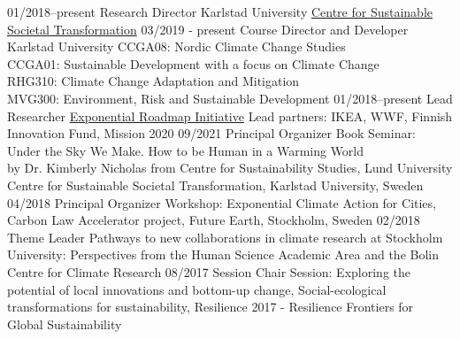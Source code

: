 \documentclass[]{friggeri-cv} %
\begin{document}
\begin{entrylist}
\entry
{\small{01/2018--present}}
{Research Director}
{Karlstad University}
{\href{https://www.kau.se/en/crs}{Centre for Sustainable Societal Transformation}}
\entry
{\small{03/2019 - present}}
{Course Director and Developer}
{Karlstad University}
{CCGA08: Nordic Climate Change Studies\\
CCGA01: Sustainable Development with a focus on Climate Change\\
RHG310: Climate Change Adaptation and Mitigation\\
MVG300: Environment, Risk and Sustainable Development}
\entry
{\small{01/2018--present}}
{Lead Researcher}
{\href{https://exponentialroadmap.org}{Exponential Roadmap Initiative}}
{Lead partners: IKEA, WWF, Finnish Innovation Fund, Mission 2020}
\entry
{\small{09/2021}}
{Principal Organizer}
{}
{Book Seminar: Under the Sky We Make. How to be Human in a Warming World\\
by Dr. Kimberly Nicholas from Centre for Sustainability Studies, Lund University\\
Centre for Sustainable Societal Transformation, Karlstad University, Sweden}
\entry
{\small{04/2018}}
{Principal Organizer}
{}
{Workshop: Exponential Climate Action for Cities, Carbon Law Accelerator project, Future Earth, Stockholm, Sweden}
\entry
{\small{02/2018}}
{Theme Leader}
{}
{Pathways to new collaborations in climate research at Stockholm University: Perspectives from the Human Science Academic Area and the Bolin Centre for Climate Research}
\entry
{\small{08/2017}}
{Session Chair}
{}
{Session: Exploring the potential of local innovations and bottom-up change, Social-ecological transformations for sustainability, Resilience 2017 - Resilience Frontiers for Global Sustainability}
\end{entrylist}
\end{document}
